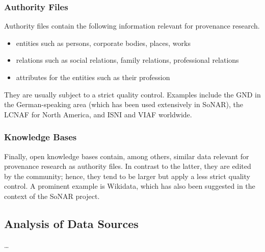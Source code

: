 \subsubsection{Authority Files}

Authority files contain the following information relevant for provenance research.
%
\begin{itemize}
  \item
    entities such as persons, corporate bodies, places, works
  \item
    relations such as social relations, family relations, professional relations
  \item
    attributes for the entities such as their profession
\end{itemize}
%
They are usually subject to a strict quality control.
Examples include the \gls{GND} in the German-speaking area (which has been used extensively in SoNAR),
the \gls{LCNAF} for North America,
and \gls{ISNI} and \gls{VIAF} worldwide.

\subsubsection{Knowledge Bases}

Finally, open knowledge bases contain, among others, similar data relevant for provenance research as authority files.
In contrast to the latter, they are edited by the community; hence, they tend to be larger but apply
a less strict quality control. A prominent example is Wikidata, which has also been suggested in the context of the SoNAR project.

\subsection{Analysis of Data Sources}

\dots

\par\bigskip
{}

